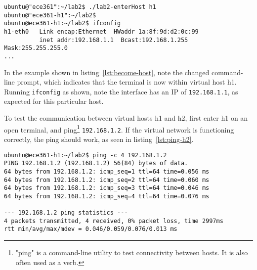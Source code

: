\documentclass[11pt]{article}
\begin{document}
\begin{lstlisting}[style=ece361shell, caption={Entering into one of the virtual hosts.}, label={lst:become-host}]
ubuntu@"ece361":~/lab2$ ./lab2-enterHost h1
ubuntu@"ece361-h1":~/lab2$
ubuntu@ece361-h1:~/lab2$ ifconfig
h1-eth0   Link encap:Ethernet  HWaddr 1a:8f:9d:d2:0c:99
          inet addr:192.168.1.1  Bcast:192.168.1.255  Mask:255.255.255.0
...
\end{lstlisting}

In the example shown in listing~\ref{lst:become-host}, note the changed command-line prompt, which indicates that the terminal is now within virtual host h1.
Running \texttt{ifconfig} as shown, note the interface has an IP of \texttt{192.168.1.1}, as expected for this particular host.


To test the communication between virtual hosts h1 and h2, first enter h1 on an open terminal, and ping\footnote{"ping" is a command-line utility to test connectivity between hosts. It is also often used as a verb.} \texttt{192.168.1.2}.
If the virtual network is functioning correctly, the ping should work, as seen in listing~\ref{lst:ping-h2}.

\begin{lstlisting}[style=ece361shell, caption={Pinging h2 from within h1.}, label={lst:ping-h2}]
ubuntu@ece361-h1:~/lab2$ ping -c 4 192.168.1.2
PING 192.168.1.2 (192.168.1.2) 56(84) bytes of data.
64 bytes from 192.168.1.2: icmp_seq=1 ttl=64 time=0.056 ms
64 bytes from 192.168.1.2: icmp_seq=2 ttl=64 time=0.060 ms
64 bytes from 192.168.1.2: icmp_seq=3 ttl=64 time=0.046 ms
64 bytes from 192.168.1.2: icmp_seq=4 ttl=64 time=0.076 ms

--- 192.168.1.2 ping statistics ---
4 packets transmitted, 4 received, 0% packet loss, time 2997ms
rtt min/avg/max/mdev = 0.046/0.059/0.076/0.013 ms
\end{lstlisting}
\end{document}
